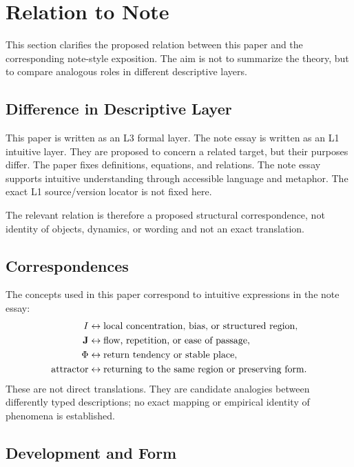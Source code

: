 \section{Relation to Note}

This section clarifies the proposed relation between this paper and the corresponding note-style exposition. The aim is not to summarize the theory, but to compare analogous roles in different descriptive layers.

\subsection{Difference in Descriptive Layer}

This paper is written as an L3 formal layer. The note essay is written as an L1 intuitive layer. They are proposed to concern a related target, but their purposes differ. The paper fixes definitions, equations, and relations. The note essay supports intuitive understanding through accessible language and metaphor. The exact L1 source/version locator is not fixed here.

The relevant relation is therefore a proposed structural correspondence, not identity of objects, dynamics, or wording and not an exact translation.

\subsection{Correspondences}

The concepts used in this paper correspond to intuitive expressions in the note essay:
\begin{align}
  I &\leftrightarrow \text{local concentration, bias, or structured region},\\
  \mathbf{J} &\leftrightarrow \text{flow, repetition, or ease of passage},\\
  \Phi &\leftrightarrow \text{return tendency or stable place},\\
  \text{attractor} &\leftrightarrow \text{returning to the same region or preserving form}.
\end{align}
These are not direct translations. They are candidate analogies between differently typed descriptions; no exact mapping or empirical identity of phenomena is established.

\subsection{Development and Form}

